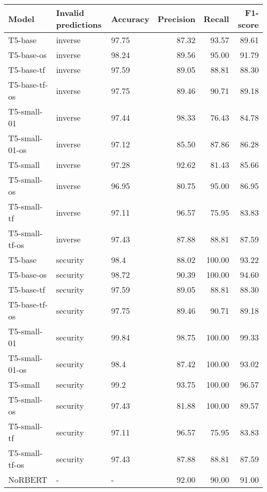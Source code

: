 \begin{tabular}{lllrrr}
\toprule
         Model & Invalid predictions & Accuracy &  Precision &  Recall &  F1-score \\
\midrule
       T5-base &             inverse &    97.75 &      87.32 &   93.57 &     89.61 \\
    T5-base-os &             inverse &    98.24 &      89.56 &   95.00 &     91.79 \\
    T5-base-tf &             inverse &    97.59 &      89.05 &   88.81 &     88.30 \\
 T5-base-tf-os &             inverse &    97.75 &      89.46 &   90.71 &     89.18 \\
   T5-small-01 &             inverse &    97.44 &      98.33 &   76.43 &     84.78 \\
T5-small-01-os &             inverse &    97.12 &      85.50 &   87.86 &     86.28 \\
      T5-small &             inverse &    97.28 &      92.62 &   81.43 &     85.66 \\
   T5-small-os &             inverse &    96.95 &      80.75 &   95.00 &     86.95 \\
   T5-small-tf &             inverse &    97.11 &      96.57 &   75.95 &     83.83 \\
T5-small-tf-os &             inverse &    97.43 &      87.88 &   88.81 &     87.59 \\
       T5-base &            security &     98.4 &      88.02 &  100.00 &     93.22 \\
    T5-base-os &            security &    98.72 &      90.39 &  100.00 &     94.60 \\
    T5-base-tf &            security &    97.59 &      89.05 &   88.81 &     88.30 \\
 T5-base-tf-os &            security &    97.75 &      89.46 &   90.71 &     89.18 \\
   T5-small-01 &            security &    99.84 &      98.75 &  100.00 &     99.33 \\
T5-small-01-os &            security &     98.4 &      87.42 &  100.00 &     93.02 \\
      T5-small &            security &     99.2 &      93.75 &  100.00 &     96.57 \\
   T5-small-os &            security &    97.43 &      81.88 &  100.00 &     89.57 \\
   T5-small-tf &            security &    97.11 &      96.57 &   75.95 &     83.83 \\
T5-small-tf-os &            security &    97.43 &      87.88 &   88.81 &     87.59 \\
       NoRBERT &                   - &        - &      92.00 &   90.00 &     91.00 \\
\bottomrule
\end{tabular}
